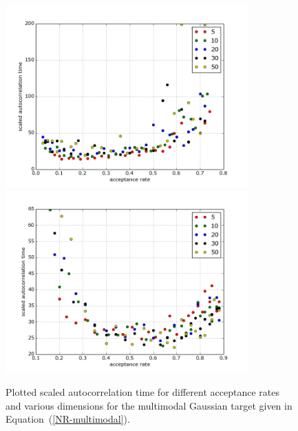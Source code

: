 \begin{figure}%
 \begin{center} 
  \includegraphics[width=0.83\textwidth]{RWM_ScaledAutocorrelationsDiagramm_MultimodalGaussian-m=2}
  \vspace*{1mm}
  \label{fig:OptimalScaling-RWM-dimensions}
  \vspace*{3mm}
  \includegraphics[width=0.83\textwidth]{MALA_ScaledAutocorrelationsDiagramm_MultimodalGaussian-m=2}
  \vspace*{1mm}
  \label{fig:OptimalScaling-MALA-dimensions}
 \end{center}
  \caption{Plotted scaled autocorrelation time for different acceptance rates and various dimensions for the multimodal Gaussian target given in Equation~(\ref{NR-multimodal}).}
  \label{fig:OptimalScaling for RWM and MALA in various dimensions}
\end{figure}

